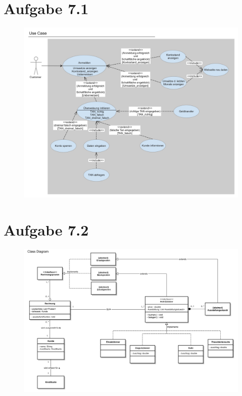 \documentclass{scrartcl}
\begin{document}
	
	
	
	
	\section*{Aufgabe 7.1}
	 \begin{figure}[h!]
	 	\includegraphics[scale=0.18]{aufgabe_7_1.jpg}
	 \end{figure}
 	
	\pagebreak
	
	\section*{Aufgabe 7.2}
		\begin{figure}[h!]
			\includegraphics[scale=0.15]{aufgabe_7_2.jpg}
		\end{figure}
	
\end{document}
